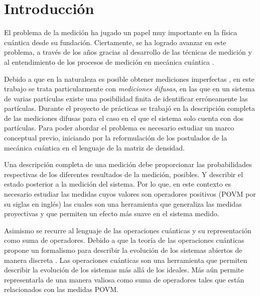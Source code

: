 \chapter*{Introducción}

El problema de la medición ha jugado un papel muy importante en la física
cuántica desde su fundación. Ciertamente, se ha logrado avanzar en este
problema, a través de los años gracias al desarrollo de las técnicas de
medición y al entendimiento de los procesos de medición en mecánica cuántica
{\cite{Pineda_2021}}. 

Debido a que en la naturaleza es posible obtener mediciones imperfectas , en
este trabajo se trata particularmente con \textit{mediciones difusas}, en las
que en un sistema de varias partículas existe una posibilidad finita de
identificar erróneamente las partículas. Durante el proyecto de prácticas se
trabajó en la descripción completa de las mediciones difusas para el caso en el
que el sistema solo cuenta con dos partículas. Para poder abordar el problema
es necesario estudiar un marco conceptual previo, iniciando por la
reformulación de los postulados de la mecánica cuántica en el lenguaje de la
matriz de densidad.

Una descripción completa de una medición debe proporcionar las probabilidades
respectivas de los diferentes resultados de la medición, posibles. Y describir
el estado posterior a la medición del sistema. Por lo que, en este contexto es
necesario estudiar las medidas cuyos valores son operadores positivos (POVM por
su siglas en inglés) las cuales son una herramienta que generaliza las medidas
proyectivas y que permiten un efecto más suave en el sistema medido.  

Asimismo se recurre al lenguaje de las operaciones cuánticas y su
representación como  suma de operadores. Debido a que la teoría de las
operaciones cuánticas propone un formalismo para describir la evolución de los
sistemas abiertos de manera discreta {\cite{nielsen_chuang_2010}}. Las
operaciones cuánticas son una herramienta que permiten describir la evolución
de los sistemas más allá de los ideales. Más aún permite representarla de una
manera valiosa como suma de operadores tales que están relacionados con las
medidas POVM\@.

